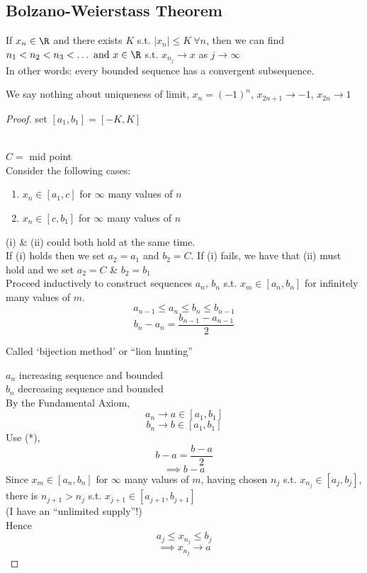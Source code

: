 \subsection{Bolzano-Weierstass Theorem}
\begin{theorem}
If $x_n \in \R$ and there exists $K$ s.t. $|x_n| \leq K\ \forall n$, then we can find $n_1<n_2<n_3<\dots \text{ and } x \in \R$
s.t. $x_{n_j} \to x$ as $j \to \infty$\\
In other words: every bounded sequence has a convergent subsequence.
\begin{remark}
We say nothing about uniqueness of limit, $x_n = (-1)^n$, $x_{2n+1} \to -1$, $x_{2n} \to 1$
\end{remark}
\begin{proof}
set $[a_1,b_1] = [-K,K]$\\
\\
$C =$ mid point\\
Consider the following cases:
\begin{enumerate}
    \item $x_n \in [a_1,c]$ for $\infty$ many values of $n$
    \item $x_n \in [c,b_1]$ for $\infty$ many values of $n$
\end{enumerate}
(i) \& (ii) could both hold at the same time.\\
If (i) holds then we set $a_2 = a_1$ and $b_2 = C$. If (i) fails, we have that (ii) must hold and we set $a_2 = C$ \& $b_2 = b_1$\\
Proceed inductively to construct sequences $a_n,\, b_n$ s.t. $x_m \in [a_n,b_n]$ for infinitely many values of $m$.\\
\[a_{n-1} \leq a_n \leq b_n \leq b_{n-1}\]
\[b_n - a_n = \frac{b_{n-1} - a_{n-1}}{2} \tag{*}\]

\begin{note}
Called `bijection method' or ``lion hunting''
\end{note}
$a_n$ increasing sequence and bounded\\
$b_n$ decreasing sequence and bounded\\
By the Fundamental Axiom,
\[a_n \to a \in [a_1,b_1]\]
\[b_n \to b \in [a_1,b_1]\]
Use (*), \[b-a = \frac{b-a}{2}\]
\[\implies b - a\]
Since $x_m \in [a_n,b_n]$ for $\infty$ many values of $m$, having chosen $n_j$ s.t. $x_{n_j} \in [a_j,b_j]$, there is $n_{j+1} > n_j$ s.t. $x_{j+1} \in [a_{j+1},b_{j+1}]$\\
(I have an ``unlimited supply''!)\\
Hence
\[a_j \leq x_{n_j} \leq b_j\]
\[\implies x_{n_j} \to a\]
\end{proof}
\end{theorem}
